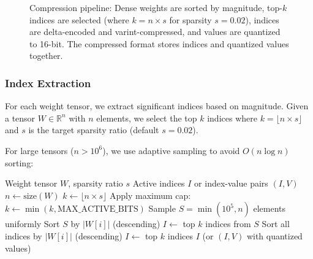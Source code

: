\documentclass[11pt]{article}
\begin{document}
\begin{figure}[H]
\caption{Compression pipeline: Dense weights are sorted by magnitude, top-$k$ indices are selected (where $k = n \times s$ for sparsity $s = 0.02$), indices are delta-encoded and varint-compressed, and values are quantized to 16-bit. The compressed format stores indices and quantized values together.}
\label{fig:compression_pipeline}
\end{figure}
\vspace{-0.2cm}

\subsubsection{Index Extraction}

For each weight tensor, we extract significant indices based on magnitude. Given a tensor $W \in \mathbb{R}^{n}$ with $n$ elements, we select the top $k$ indices where $k = \lfloor n \times s \rfloor$ and $s$ is the target sparsity ratio (default $s = 0.02$).

For large tensors ($n > 10^6$), we use adaptive sampling to avoid $O(n \log n)$ sorting:

\begin{algorithm}[h]
\caption{Significant Index Extraction}
\begin{algorithmic}[1]
\REQUIRE Weight tensor $W$, sparsity ratio $s$
\ENSURE Active indices $I$ or index-value pairs $(I, V)$
\STATE $n \leftarrow \text{size}(W)$
\STATE $k \leftarrow \lfloor n \times s \rfloor$
\STATE Apply maximum cap: $k \leftarrow \min(k, \text{MAX\_ACTIVE\_BITS})$
    \STATE Sample $S = \min(10^5, n)$ elements uniformly
    \STATE Sort $S$ by $|W[i]|$ (descending)
    \STATE $I \leftarrow$ top $k$ indices from $S$
\ELSE
    \STATE Sort all indices by $|W[i]|$ (descending)
    \STATE $I \leftarrow$ top $k$ indices
\ENDIF
\RETURN $I$ (or $(I, V)$ with quantized values)
\end{algorithmic}
\end{algorithm}
\end{document}
